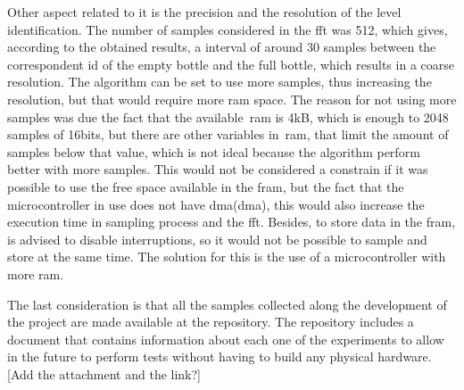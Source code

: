 Other aspect related to it is the precision and the resolution of the level identification. The number of samples considered in the \acrshort{fft} was 512, which gives, according to the obtained results, a interval of around 30 samples between the correspondent id of the empty bottle and the full bottle, which results in a coarse resolution. The algorithm can be set to use more samples, thus increasing the resolution, but that would require more \acrshort{ram} space. The reason for not using more samples was due the fact that the available~\acrshort{ram} is 4kB, which is enough to 2048 samples of 16bits, but there are other variables in~\acrshort{ram}, that limit the amount of samples below that value, which is not ideal because the algorithm perform better with more samples. This would not be considered a constrain if it was possible to use the free space available in the \acrshort{fram}, but the fact that the microcontroller in use does not have \acrshort{dma}(\acrlong{dma}), this would also increase the execution time in sampling process and the \acrshort{fft}. Besides, to store data in the \acrshort{fram}, is advised to disable interruptions, so it would not be possible to sample and store at the same time. The solution for this is the use of a microcontroller with more \acrshort{ram}. 

The last consideration is that all the samples collected along the development of the project are made available at the repository. The repository includes a document that contains information about each one of the experiments to allow in the future to perform tests without having to build any physical hardware.[Add the attachment and the link?]


